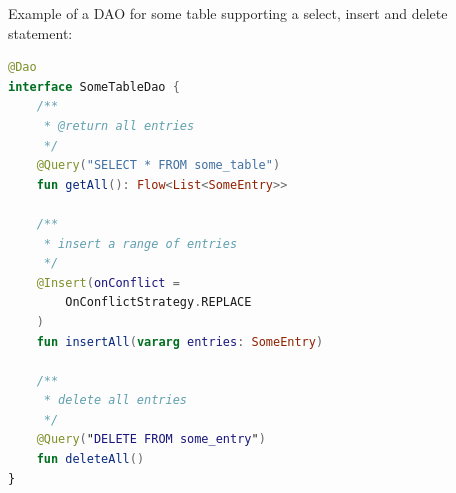 Example of a DAO for some table supporting a select, insert and delete statement:

\begin{lstlisting}[language=Kotlin]
@Dao
interface SomeTableDao {
    /**
     * @return all entries
     */
    @Query("SELECT * FROM some_table")
    fun getAll(): Flow<List<SomeEntry>>

    /**
     * insert a range of entries
     */
    @Insert(onConflict = 
        OnConflictStrategy.REPLACE
    )
    fun insertAll(vararg entries: SomeEntry)

    /**
     * delete all entries
     */
    @Query("DELETE FROM some_entry")
    fun deleteAll()
}
\end{lstlisting}